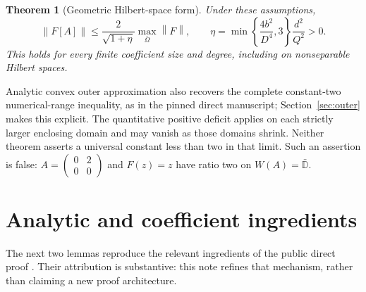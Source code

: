 \documentclass[11pt]{article}
\newtheorem{theorem}{Theorem}[section]
\theoremstyle{remark}\newtheorem{remark}[theorem]{Remark}
\newcommand{\norm}[1]{\left\lVert #1\right\rVert}
\begin{document}
\begin{theorem}[Geometric Hilbert-space form]\label{thm:hilbert}
Under these assumptions,
\begin{equation}\label{eq:geometric}
\norm{F[A]}\le \frac{2}{\sqrt{1+\eta}}\max_{\bar\Omega}\norm{F},\qquad
\eta=\min\left\{\frac{4b^2}{D^4},3\right\}\frac{d^2}{Q^2}>0.
\end{equation}
This holds for every finite coefficient size and degree, including on nonseparable Hilbert spaces.
\end{theorem}

Analytic convex outer approximation also recovers the complete constant-two numerical-range inequality, as in the pinned direct manuscript; Section~\ref{sec:outer} makes this explicit. The quantitative positive deficit applies on each strictly larger enclosing domain and may vanish as those domains shrink. Neither theorem asserts a universal constant less than two in that limit. Such an assertion is false: $A=\left(\begin{smallmatrix}0&2\\0&0\end{smallmatrix}\right)$ and $F(z)=z$ have ratio two on $W(A)=\bar{\mathbb D}$.

\section{Analytic and coefficient ingredients}
The next two lemmas reproduce the relevant ingredients of the public direct proof \cite{OAI}. Their attribution is substantive: this note refines that mechanism, rather than claiming a new proof architecture.
\end{document}
